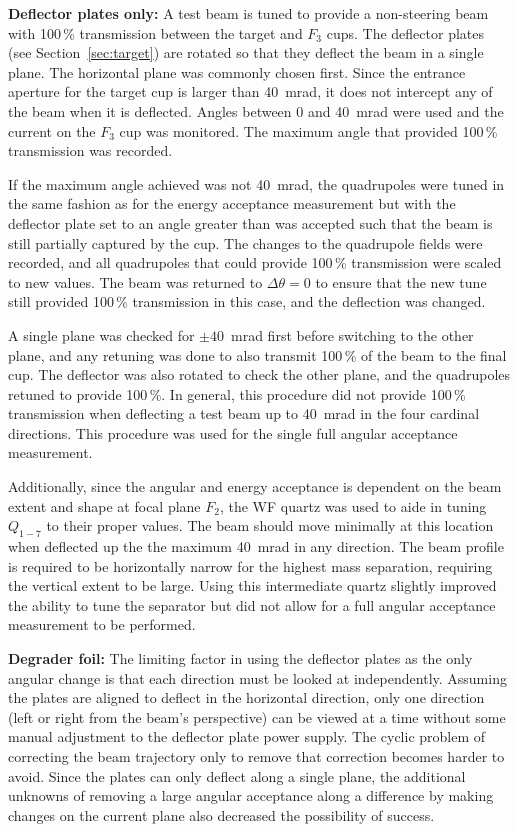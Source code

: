 \textbf{Deflector plates only:}
A test beam is tuned to provide a non-steering beam with 100\,\% transmission
between the target and $F_3$ cups. The deflector plates (see
Section~\ref{sec:target}) are rotated so that they deflect the beam in a single
plane. The horizontal plane was commonly chosen first. Since the entrance
aperture for the target cup is larger than 40~mrad, it does not intercept any
of the beam when it is deflected. Angles between 0 and 40~mrad were used and
the current on the $F_3$ cup was monitored. The maximum angle that provided
100\,\% transmission was recorded.

If the maximum angle achieved was not 40~mrad, the quadrupoles were tuned in
the same fashion as for the energy acceptance measurement but with the
deflector plate set to an angle greater than was accepted such that the beam
is still partially captured by the cup. The changes to the quadrupole fields
were recorded, and all quadrupoles that could provide 100\,\% transmission were
scaled to new values. The beam was returned to $\Delta\theta = 0$ to ensure
that the new tune still provided 100\,\% transmission in this case, and the
deflection was changed.

A single plane was checked for $\pm 40$~mrad first before switching to the
other plane, and any retuning was done to also transmit 100\,\% of the beam to
the final cup. The deflector was also rotated to check the other plane, and
the quadrupoles retuned to provide 100\,\%. In general, this procedure did not
provide 100\,\% transmission when deflecting a test beam up to 40~mrad in the
four cardinal directions. This procedure was used for the single full angular
acceptance measurement.

Additionally, since the angular and energy acceptance is dependent on the
beam extent and shape at focal plane $F_2$, the WF quartz was used to
aide in tuning $Q_{1-7}$ to their proper values. The beam should move minimally
at this location when deflected up the the maximum 40~mrad in any direction.
The beam profile is required to be horizontally narrow for the highest mass
separation, requiring the vertical extent to be large. Using this intermediate
quartz slightly improved the ability to tune the separator but did not allow
for a full angular acceptance measurement to be performed.

\textbf{Degrader foil:}
The limiting factor in using the deflector plates as the only angular change is
that each direction must be looked at independently. Assuming the plates are
aligned to deflect in the horizontal direction, only one direction (left or
right from the beam's perspective) can be viewed at a time without some
manual adjustment to the deflector plate power supply. The cyclic problem of
correcting the beam trajectory only to remove that correction becomes harder to
avoid. Since the plates can only deflect along a single plane, the additional
unknowns of removing a large angular acceptance along a difference by making
changes on the current plane also decreased the possibility of success.

